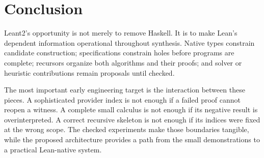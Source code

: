 \section{Conclusion}

Leant2's opportunity is not merely to remove Haskell. It is to make Lean's dependent information operational throughout synthesis. Native types constrain candidate construction; specifications constrain holes before programs are complete; recursors organize both algorithms and their proofs; and solver or heuristic contributions remain proposals until checked.

The most important early engineering target is the interaction between these pieces. A sophisticated provider index is not enough if a failed proof cannot reopen a witness. A complete small calculus is not enough if its negative result is overinterpreted. A correct recursive skeleton is not enough if its indices were fixed at the wrong scope. The checked experiments make those boundaries tangible, while the proposed architecture provides a path from the small demonstrations to a practical Lean-native system.
